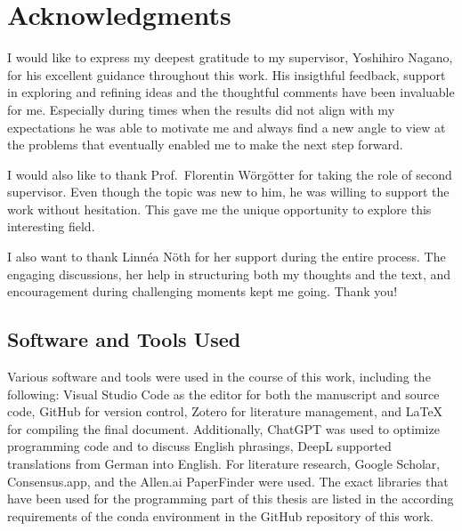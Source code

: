 

\chapter*{Acknowledgments}


I would like to express my deepest gratitude to my supervisor, Yoshihiro Nagano, for his excellent guidance throughout this work. His insigthful feedback, support in exploring and refining ideas and the thoughtful comments have been invaluable for me. Especially during times when the results did not align with my expectations he was able to motivate me and always find a new angle to view at the problems that eventually enabled me to make the next step forward. 

I would also like to thank Prof.\ Florentin Wörgötter for taking the role of second supervisor. Even though the topic was new to him, he was willing to support the work without hesitation. This gave me the unique opportunity to explore this interesting field. 

I also want to thank Linnéa Nöth for her support during the entire process. The engaging discussions, her help in structuring both my thoughts and the text, and encouragement during challenging moments kept me going. Thank you!

\section*{Software and Tools Used}


Various software and tools were used in the course of this work, including the following: Visual Studio Code as the editor for both the manuscript and source code, GitHub for version control, Zotero for literature management, and LaTeX for compiling the final document. Additionally, ChatGPT was used to optimize programming code and to discuss English phrasings, DeepL supported translations from German into English. For literature research, Google Scholar, Consensus.app, and the Allen.ai PaperFinder were used. The exact libraries that have been used for the programming part of this thesis are listed in the according requirements of the conda environment in the GitHub repository of this work. 
